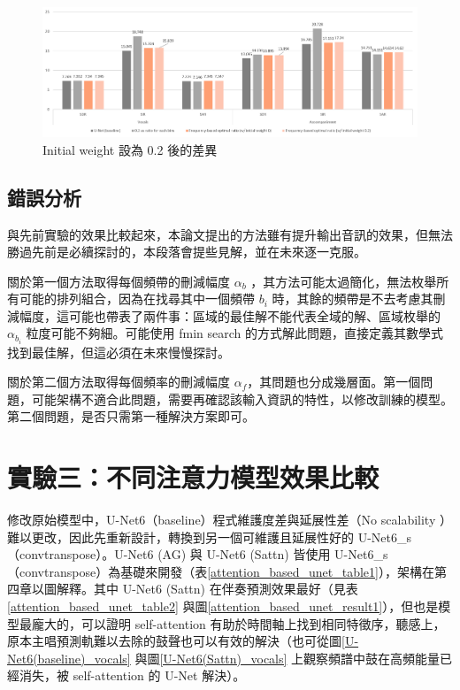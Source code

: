 \begin{figure}[htbp]
    \hfil
    \begin{minipage}[t]{1.0\textwidth}
        \includegraphics[width=\textwidth]{./figures/chapter05_result/magnitude_subtraction_method_result3.png}
        \caption {Initial weight 設為 0.2 後的差異}
        \label{magnitude_subtraction_method_result3}
    \end{minipage}
    \hfil
\end{figure}

\subsection*{錯誤分析}
與先前實驗的效果比較起來，本論文提出的方法雖有提升輸出音訊的效果，但無法勝過先前是必續探討的，本段落會提些見解，並在未來逐一克服。

關於第一個方法取得每個頻帶的刪減幅度 $\alpha_b$ ，其方法可能太過簡化，無法枚舉所有可能的排列組合，因為在找尋其中一個頻帶 $b_i$ 時，其餘的頻帶是不去考慮其刪減幅度，這可能也帶表了兩件事：區域的最佳解不能代表全域的解、區域枚舉的 $\alpha_{b_i}$ 粒度可能不夠細。可能使用 fmin search 的方式解此問題，直接定義其數學式找到最佳解，但這必須在未來慢慢探討。

關於第二個方法取得每個頻率的刪減幅度 $\alpha_f$，其問題也分成幾層面。第一個問題，可能架構不適合此問題，需要再確認該輸入資訊的特性，以修改訓練的模型。第二個問題，是否只需第一種解決方案即可。

\clearpage

\section{實驗三：不同注意力模型效果比較}
修改原始模型中，U-Net6（baseline）程式維護度差與延展性差（No scalability ）難以更改，因此先重新設計，轉換到另一個可維護且延展性好的 U-Net6\_s（convtranspose）。U-Net6 (AG) 與 U-Net6 (Sattn) 皆使用 U-Net6\_s（convtranspose）為基礎來開發（表\ref{attention_based_unet_table1}），架構在第四章以圖解釋。其中 U-Net6 (Sattn) 在伴奏預測效果最好（見表\ref{attention_based_unet_table2} 與圖\ref{attention_based_unet_result1}），但也是模型最龐大的，可以證明 self-attention 有助於時間軸上找到相同特徵序，聽感上，原本主唱預測軌難以去除的鼓聲也可以有效的解決（也可從圖\ref{U-Net6(baseline)_vocals} 與圖\ref{U-Net6(Sattn)_vocals} 上觀察頻譜中鼓在高頻能量已經消失，被 self-attention 的 U-Net 解決）。

